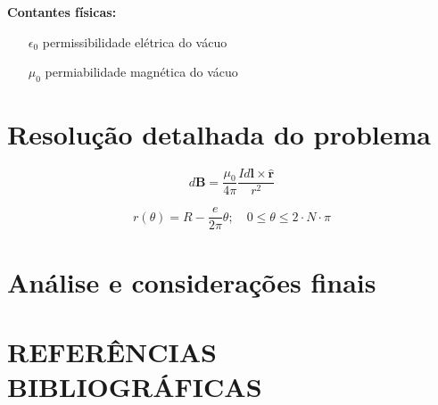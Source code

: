 \documentclass[
	article,			%
	11pt,				%
	oneside,			%
	a4paper,			%
	english,			%
	brazil,				%
	sumario=tradicional
	]{abntex2}
\begin{document}
\textbf{Contantes físicas:}

\begin{itemize}
	\item[$ \epsilon_0 $] permissibilidade elétrica do vácuo
	\item[$ \mu_0 $] permiabilidade magnética do vácuo
\end{itemize}

\section{Resolução detalhada do problema}

\begin{equation}
	d\textbf{B} = \frac{\mu_0}{4\pi} \frac{Id\textbf{l} \times \hat{\textbf{r}}}{r^2}
	\label{biot-savart}
\end{equation}

\begin{equation}
	r(\theta) = R - \frac{e}{2\pi}\theta;\quad 
	0 \le \theta \le 2\cdot N \cdot \pi
	\label{curva-espira}
\end{equation}



\section{Análise e considerações finais}

\section{REFERÊNCIAS BIBLIOGRÁFICAS}
\end{document}
